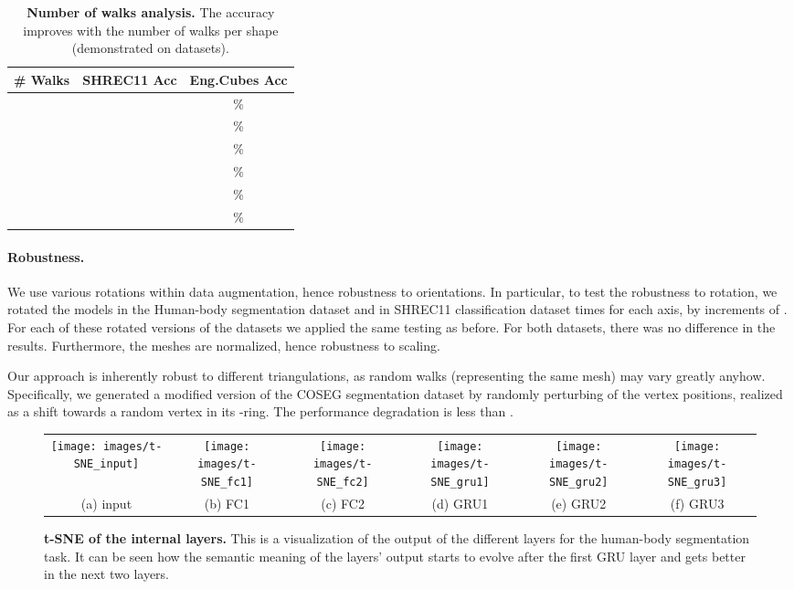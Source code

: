 \documentclass[acmtog]{acmart}
\begin{document}
\begin{table}[tb]\caption{{\bf Number of walks analysis.}
The accuracy improves with the number of walks per shape (demonstrated on  datasets). 
}
\begin{center}
 \begin{tabular}{||c c c||} 
 \hline
 \# Walks & SHREC11 Acc & Eng.Cubes Acc\\ [0.5ex] 
 \hline\hline\hline
  &  & \%  \\ 
 \hline
  &  & \%   \\ 
 \hline
  &  & \%   \\ 
 \hline
  &  & \%   \\ 
 \hline
  &  & \%   \\ 
 \hline
  &  & \%   \\ 
 \hline
  \end{tabular}
\label{tbl:accuracy_per_n_walks}
\end{center}
\end{table}

\paragraph{Robustness.}
We use various rotations within data augmentation, hence robustness to orientations.
In particular, to test the robustness to rotation, we rotated the models in the Human-body segmentation dataset and in SHREC11 classification dataset  times for each axis, by increments of .
For each of these rotated versions of the datasets we applied the same testing as before.
For both datasets, there was no difference in the results.
Furthermore, the meshes are normalized, hence robustness to scaling. 

Our approach is inherently robust to different triangulations, as random walks (representing the same mesh) may vary greatly anyhow. 
Specifically, we generated a modified version of the COSEG segmentation dataset by randomly perturbing  of the vertex positions, realized as a shift towards a random vertex in its -ring. 
The performance degradation is less than .

\begin{figure*}
\centering
\begin{tabular}{cccccc}
\texttt{[image: images/t-SNE\_input]}&
\texttt{[image: images/t-SNE\_fc1]}&
\texttt{[image: images/t-SNE\_fc2]}&
\texttt{[image: images/t-SNE\_gru1]}&
\texttt{[image: images/t-SNE\_gru2]}&
\texttt{[image: images/t-SNE\_gru3]}\\
(a) input &
(b) FC1 &
(c) FC2 &
(d) GRU1&
(e) GRU2 &
(f) GRU3
\end{tabular}
\caption{{\bf t-SNE of the internal layers.}
This is a visualization of the output of the different layers for the human-body segmentation task.
It can be seen how the semantic meaning of the layers' output starts to evolve after the first GRU layer and gets better in the next two layers.
} 
\label{fig:t_sne_all_layers}
\end{figure*}
\end{document}
